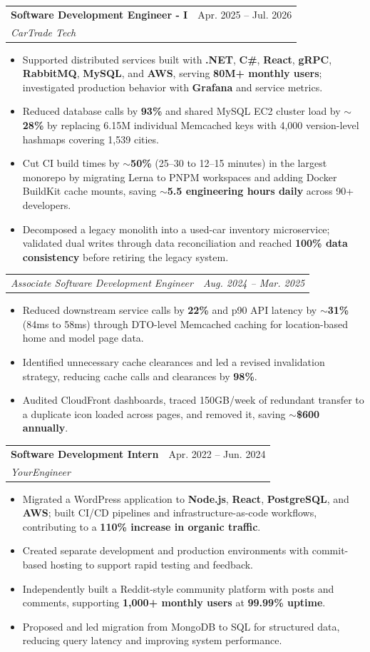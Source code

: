 \documentclass[letterpaper,11pt]{article}
\makeatletter
\newcommand{\resumeItem}[1]{
  \item\small{
    {#1 \vspace{-2pt}}
  }
}
\newcommand{\resumeSubheading}[4]{
  \vspace{-2pt}\item
    \begin{tabular*}{0.97\textwidth}[t]{l@{\extracolsep{\fill}}r}
      \textbf{#1} & #2 \\
      \textit{\small#3} & \textit{\small #4} \\
    \end{tabular*}\vspace{-7pt}
}
\newcommand{\resumeSubSubheading}[2]{
    \item
    \begin{tabular*}{0.97\textwidth}{l@{\extracolsep{\fill}}r}
      \textit{\small#1} & \textit{\small #2} \\
    \end{tabular*}\vspace{-7pt}
}
\newcommand{\resumeItemListStart}{\begin{itemize}}
\newcommand{\resumeItemListEnd}{\end{itemize}\vspace{-5pt}}
\makeatother
\begin{document}
\resumeSubheading
{Software Development Engineer - I}{Apr. 2025 -- Jul. 2026}
{CarTrade Tech}{ }
\resumeItemListStart
\resumeItem{Supported distributed services built with \textbf{.NET}, \textbf{C\#}, \textbf{React}, \textbf{gRPC}, \textbf{RabbitMQ}, \textbf{MySQL}, and \textbf{AWS}, serving \textbf{80M+ monthly users}; investigated production behavior with \textbf{Grafana} and service metrics.}
\resumeItem{Reduced database calls by \textbf{93\%} and shared MySQL EC2 cluster load by \textbf{$\sim$28\%} by replacing 6.15M individual Memcached keys with 4,000 version-level hashmaps covering 1,539 cities.}
\resumeItem{Cut CI build times by \textbf{$\sim$50\%} (25--30 to 12--15 minutes) in the largest monorepo by migrating Lerna to PNPM workspaces and adding Docker BuildKit cache mounts, saving \textbf{$\sim$5.5 engineering hours daily} across 90+ developers.}
\resumeItem{Decomposed a legacy monolith into a used-car inventory microservice; validated dual writes through data reconciliation and reached \textbf{100\% data consistency} before retiring the legacy system.}
\resumeItemListEnd
\resumeSubSubheading
{Associate Software Development Engineer}{Aug. 2024 -- Mar. 2025}
\resumeItemListStart
\resumeItem{Reduced downstream service calls by \textbf{22\%} and p90 API latency by \textbf{$\sim$31\%} (84ms to 58ms) through DTO-level Memcached caching for location-based home and model page data.}
\resumeItem{Identified unnecessary cache clearances and led a revised invalidation strategy, reducing cache calls and clearances by \textbf{98\%}.}
\resumeItem{Audited CloudFront dashboards, traced 150GB/week of redundant transfer to a duplicate icon loaded across pages, and removed it, saving \textbf{$\sim$\$600 annually}.}
\resumeItemListEnd

\resumeSubheading
{Software Development Intern}{Apr. 2022 -- Jun. 2024}
{YourEngineer}{ }
\resumeItemListStart
\resumeItem{Migrated a WordPress application to \textbf{Node.js}, \textbf{React}, \textbf{PostgreSQL}, and \textbf{AWS}; built CI/CD pipelines and infrastructure-as-code workflows, contributing to a \textbf{110\% increase in organic traffic}.}
\resumeItem{Created separate development and production environments with commit-based hosting to support rapid testing and feedback.}
\resumeItem{Independently built a Reddit-style community platform with posts and comments, supporting \textbf{1,000+ monthly users} at \textbf{99.99\% uptime}.}
\resumeItem{Proposed and led migration from MongoDB to SQL for structured data, reducing query latency and improving system performance.}
\resumeItemListEnd
\end{document}

